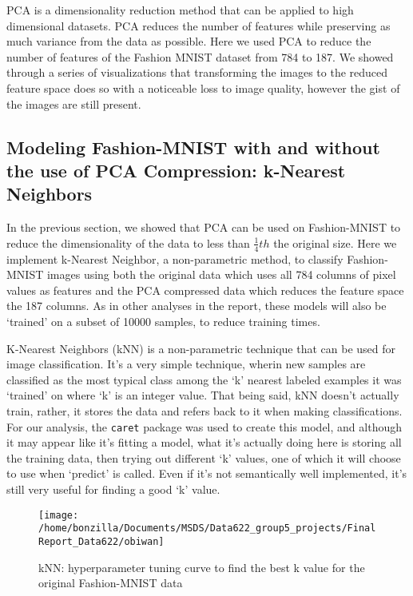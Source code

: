 \documentclass{article}
\begin{document}
PCA is a dimensionality reduction method that can be applied to high
dimensional datasets. PCA reduces the number of features while
preserving as much variance from the data as possible. Here we used PCA
to reduce the number of features of the Fashion MNIST dataset from 784
to 187. We showed through a series of visualizations that transforming
the images to the reduced feature space does so with a noticeable loss
to image quality, however the gist of the images are still present.

\hypertarget{modeling-fashion-mnist-with-and-without-the-use-of-pca-compression-k-nearest-neighbors}{%
\subsection{Modeling Fashion-MNIST with and without the use of PCA
Compression: k-Nearest
Neighbors}\label{modeling-fashion-mnist-with-and-without-the-use-of-pca-compression-k-nearest-neighbors}}

In the previous section, we showed that PCA can be used on Fashion-MNIST
to reduce the dimensionality of the data to less than \(\frac{1}{4}th\)
the original size. Here we implement k-Nearest Neighbor, a
non-parametric method, to classify Fashion-MNIST images using both the
original data which uses all 784 columns of pixel values as features and
the PCA compressed data which reduces the feature space the 187 columns.
As in other analyses in the report, these models will also be `trained'
on a subset of 10000 samples, to reduce training times.

K-Nearest Neighbors (kNN) is a non-parametric technique that can be used
for image classification. It's a very simple technique, wherin new
samples are classified as the most typical class among the `k' nearest
labeled examples it was `trained' on where `k' is an integer value. That
being said, kNN doesn't actually train, rather, it stores the data and
refers back to it when making classifications. For our analysis, the
\texttt{caret} package was used to create this model, and although it
may appear like it's fitting a model, what it's actually doing here is
storing all the training data, then trying out different `k' values, one
of which it will choose to use when `predict' is called. Even if it's
not semantically well implemented, it's still very useful for finding a
good `k' value.

\begin{figure}

{\centering \texttt{[image: /home/bonzilla/Documents/MSDS/Data622\_group5\_projects/FinalReport\_Data622/obiwan]} 

}

\caption{kNN: hyperparameter tuning curve to find the best k value for the original Fashion-MNIST data}\label{fig:unnamed-chunk-9}
\end{figure}
\end{document}

